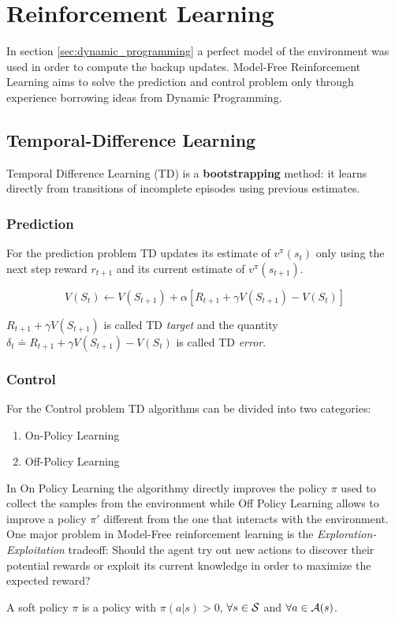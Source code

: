 \section{Reinforcement Learning}

In section \ref{sec:dynamic_programming} a perfect model of the environment was used in order to compute the backup updates.
Model-Free Reinforcement Learning aims to solve the prediction and control problem only through experience borrowing ideas from Dynamic Programming.


\subsection{Temporal-Difference Learning}
\label{subsec:TD}
Temporal Difference Learning (TD) is a \textbf{bootstrapping} method: it learns directly from transitions of incomplete episodes using previous estimates.

\subsubsection{Prediction}
For the prediction problem TD updates its estimate of $v^\pi(s_t)$ only using the next step reward $r_{t+1}$ and its current estimate of $v^\pi(s_{t+1})$.

\begin{equation}
    \label{eq:TD(0)}
    V(S_t) \gets V(S_{t+1}) + \alpha [R_{t+1} + \gamma V(S_{t+1}) - V(S_t)]
\end{equation}

$R_{t+1} + \gamma V(S_{t+1})$ is called TD \textit{target} and the quantity $\delta_t \doteq R_{t+1} + \gamma V(S_{t+1}) - V(S_t)$ is called TD \textit{error}.



\subsubsection{Control}

For the Control problem TD algorithms can be divided into two categories:
\begin{enumerate}
    \item On-Policy Learning
    \item Off-Policy Learning
\end{enumerate}

In On Policy Learning the algorithmy directly improves the policy $\pi$ used to collect the samples from the environment while
Off Policy Learning allows to improve a policy $\pi'$ different from the one that interacts with the environment.
\\
One major problem in Model-Free reinforcement learning is the \textit{Exploration-Exploitation} tradeoff:
Should the agent try out new actions to discover their potential rewards or exploit its current knowledge in order to maximize the expected reward?
\\
\begin{definition}
    A soft policy $\pi$ is a policy with $\pi(a|s) > 0$, $\forall s \in \mathcal{S}$ and $\forall a \in \mathcal{A}(s)$.
\end{definition}

